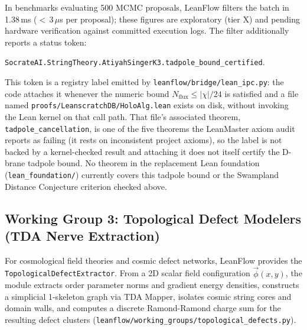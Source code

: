 \documentclass[11pt,a4paper]{article}
\newcommand{\numreconcile}[2]{#1}
\begin{document}
In benchmarks evaluating 500 MCMC proposals, LeanFlow filters the batch in \numreconcile{1.38}{MCMC batch filter latency (ms)}\,ms ($<$\,\numreconcile{3}{MCMC per-proposal filter latency ($\mu$s)}\,$\mu$s per proposal); these figures are exploratory (tier X) and pending hardware verification against committed execution logs. The filter additionally reports a status token:
\begin{center}
\texttt{SocrateAI.StringTheory.AtiyahSingerK3.tadpole\_bound\_certified}.
\end{center}
This token is a registry label emitted by \texttt{leanflow/bridge/lean\_ipc.py}: the code attaches it whenever the numeric bound $N_{\text{flux}} \le |\chi|/24$ is satisfied and a file named \texttt{proofs/LeanscratchDB/HoloAlg.lean} exists on disk, without invoking the Lean kernel on that call path. That file's associated theorem, \texttt{tadpole\_cancellation}, is one of the five theorems the LeanMaster axiom audit reports as failing (it rests on inconsistent project axioms), so the label is not backed by a kernel-checked result and attaching it does not itself certify the D-brane tadpole bound. No theorem in the replacement Lean foundation (\texttt{lean\_foundation/}) currently covers this tadpole bound or the Swampland Distance Conjecture criterion checked above.

\subsection{Working Group 3: Topological Defect Modelers (TDA Nerve Extraction)}
For cosmological field theories and cosmic defect networks, LeanFlow provides the \texttt{TopologicalDefectExtractor}. From a 2D scalar field configuration $\vec{\phi}(x, y)$, the module extracts order parameter norms and gradient energy densities, constructs a simplicial 1-skeleton graph via TDA Mapper, isolates cosmic string cores and domain walls, and computes a discrete Ramond-Ramond charge sum for the resulting defect clusters (\texttt{leanflow/working\_groups/topological\_defects.py}).
\end{document}
